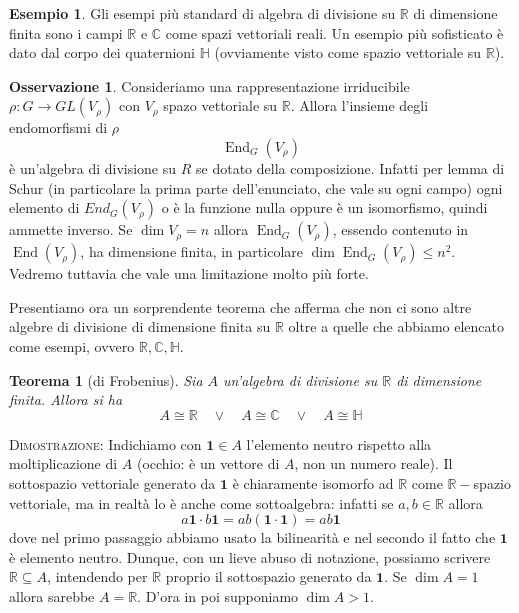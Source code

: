 \documentclass[11pt]{article}
\theoremstyle{plain}
\newtheorem{thm}{Teorema}[section]
\theoremstyle{definition}
\newtheorem{exmp}{Esempio}[section]
\newtheorem*{rem}{Osservazione}
\theoremstyle{remark}
\newcommand{\C}{\mathbb{C}}
\newcommand{\R}{\mathbb{R}}
\newcommand{\HH}{\mathbb{H}}
\DeclareMathOperator{\End}{End}
\begin{document}
\begin{exmp}
Gli esempi più standard di algebra di divisione su $\R$ di dimensione finita sono i campi $\R$ e $\C$ come spazi vettoriali reali.
Un esempio più sofisticato è dato dal corpo dei quaternioni $\HH$ (ovviamente visto come spazio vettoriale su $\R$).
\end{exmp}


\begin{rem}
Consideriamo una rappresentazione irriducibile $\rho:G\to GL(V_\rho)$ con $V_\rho$ spazo vettoriale su $\R$. Allora l'insieme degli endomorfismi
di $\rho$ 
\[ \End_G(V_\rho)\]
è un'algebra di divisione su $R$ se dotato della composizione.
Infatti per lemma di Schur (in particolare la prima parte dell'enunciato, che vale su ogni campo) ogni elemento di $End_G(V_\rho)$ o è la funzione nulla oppure è un isomorfismo, quindi ammette inverso.
Se $\dim V_\rho = n$ allora $\End_G(V_\rho)$, essendo contenuto in $\End(V_\rho)$, ha dimensione finita, in particolare $\dim \End_G(V_\rho)\le n^2$.
Vedremo tuttavia che vale una limitazione molto più forte.
\end{rem}


Presentiamo ora un sorprendente teorema che afferma che non ci sono altre algebre di divisione di dimensione finita su $\R$ oltre a quelle che abbiamo elencato come esempi, ovvero $\R, \C, \HH$.
\begin{thm}[di Frobenius]
\label{thm: frobenius}
Sia $A$ un'algebra di divisione su $\R$ di dimensione finita. Allora si ha 
\[A \cong \R \quad \vee \quad  A \cong \C \quad \vee \quad A  \cong \HH \]
\end{thm}

\textsc{Dimostrazione:}
Indichiamo con $\bm{1}\in A$ l'elemento neutro rispetto alla moltiplicazione di $A$ (occhio: è un vettore di $A$, non un numero reale).
Il sottospazio vettoriale generato da $\bm{1}$ è chiaramente isomorfo ad $\R$ come $\R-$spazio vettoriale, ma in
realtà lo è anche come sottoalgebra: infatti se $a,b\in\R$ allora
\[a\bm{1} \cdot b\bm{1} = ab (\bm{1}\cdot \bm{1}) = ab\bm{1} \]
dove nel primo passaggio abbiamo usato la bilinearità e nel secondo il fatto che $\bm{1}$ è elemento neutro.
Dunque, con un lieve abuso di notazione, possiamo scrivere $\R \subseteq A$, intendendo per $\R$ proprio il sottospazio generato da $\bm{1}$.
Se $\dim A = 1$ allora sarebbe $A=\R$. D'ora in poi supponiamo $\dim A > 1$.
\end{document}
